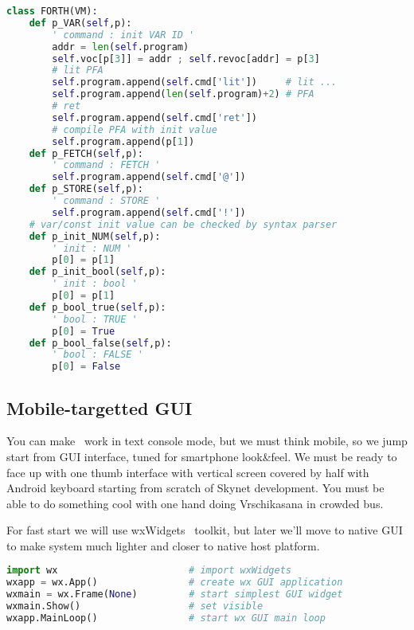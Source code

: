 \begin{lstlisting}[language=Python]
class FORTH(VM):
 	def p_VAR(self,p):
 		' command : init VAR ID '
 		addr = len(self.program)
 		self.voc[p[3]] = addr ; self.revoc[addr] = p[3]
 		# lit PFA
 		self.program.append(self.cmd['lit'])	 # lit ...
 		self.program.append(len(self.program)+2) # PFA
 		# ret
 		self.program.append(self.cmd['ret'])
 		# compile PFA with init value
 		self.program.append(p[1])
 	def p_FETCH(self,p):
 		' command : FETCH '
 		self.program.append(self.cmd['@'])
 	def p_STORE(self,p):
 		' command : STORE '
 		self.program.append(self.cmd['!'])
 	# var/const init value can be checked by syntax parser
 	def p_init_NUM(self,p):
 		' init : NUM '
 		p[0] = p[1]
 	def p_init_bool(self,p):
 		' init : bool '
 		p[0] = p[1]
 	def p_bool_true(self,p):
 		' bool : TRUE '
 		p[0] = True
 	def p_bool_false(self,p):
 		' bool : FALSE '
 		p[0] = False
\end{lstlisting}

\subsection{Mobile-targetted GUI}

You can make \F\ work in text console mode, but we must think mobile, so we 
jump
start from GUI interface, tuned for smartphone look\&feel. We must be ready to
face up with one thumb interface with vertical screen covered by half
with Android keyboard starting from scratch of Skynet development. You must be
able to do something cool with one hand doing Vrschikasana in crowded bus.

For fast start we will use wxWidgets \cite{zetwx}\ toolkit,
but later we'll move to native GUI to make system much lighter and closer to 
native host platform.

\begin{lstlisting}[language=python]
import wx						# import wxWidgets
wxapp = wx.App()				# create wx GUI application
wxmain = wx.Frame(None)			# start simplest GUI widget
wxmain.Show()					# set visible
wxapp.MainLoop()				# start wx GUI main loop
\end{lstlisting}


